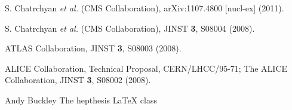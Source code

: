 \begin{thebibliography}{999}
 S. Chatrchyan {\it et al.} (CMS Collaboration), 
arXiv:1107.4800 [nucl-ex] (2011).

 S. Chatrchyan {\it et al.} (CMS Collaboration), JINST {\bf 3}, 
S08004 (2008).

 ATLAS Collaboration, JINST {\bf 3}, S08003 (2008).

 ALICE Collaboration, Technical Proposal, CERN/LHCC/95-71;
          The ALICE Collaboration, JINST {\bf 3}, S08002 (2008).

 Andy Buckley The hepthesis {\LaTeX} class



\end{thebibliography}



